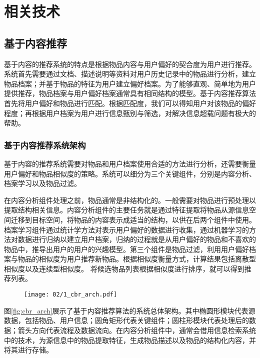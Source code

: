 
\chapter{相关技术}
\label{chap:related}

\section{基于内容推荐}

基于内容的推荐系统的特点是根据物品内容与用户偏好的契合度为用户进行推荐\parencite{lops2011content}。系统首先需要通过文档、描述说明等资料对用户历史记录中的物品进行分析，建立物品档案；并基于物品的特征为用户建立偏好档案。为了能够直观、简单地为用户提供推荐，物品档案与用户偏好档案通常具有相同结构的模型。基于内容推荐算法首先将用户偏好和物品进行匹配。根据匹配度，我们可以得知用户对该物品的偏好程度；再根据用户档案为用户进行信息甄别与筛选，对解决信息超载问题有极大的帮助。

\subsection{基于内容推荐系统架构}
基于内容的推荐系统需要对物品和用户档案使用合适的方法进行分析，还需要衡量用户偏好和物品相似度的策略。系统可以细分为三个关键组件，分别是内容分析、档案学习以及物品过滤。

在内容分析组件处理之前，物品通常是非结构化的。一般需要对物品进行预处理以提取结构相关信息。内容分析组件的主要任务就是通过特征提取将物品从源信息空间迁移到目标空间，将物品的内容表示成适当的结构，以供在后两个组件中使用。档案学习组件通过统计学方法对表示用户偏好的数据进行收集，通过机器学习的方法对数据进行归纳以建立用户档案，归纳的过程就是从用户偏好的物品和不喜欢的物品中，推导出用户的用户的兴趣模型。第三个组件是物品过滤，利用用户偏好档案与物品的相似度\parencite{herlocker2004evaluating}为用户推荐新物品。根据相似度衡量方式，计算结果包括离散型相似度以及连续型相似度。
将候选物品列表根据相似度进行排序，就可以得到推荐列表。

\begin{figure}
 \centering
 \texttt{[image: 02/1\_cbr\_arch.pdf]}
\end{figure}

图\ref{fig:cbr_arch}展示了基于内容推荐算法的系统总体架构。其中椭圆形模块代表源数据，包括物品、用户信息；圆角矩形代表关键组件；圆柱形模块代表处理后的数据；箭头方向代表流程及数据流向。在内容分析组件中，通常会借用信息检索系统中的技术，为源信息中的物品提取特征，生成物品描述以及物品的结构化内容，并将其进行存储。


